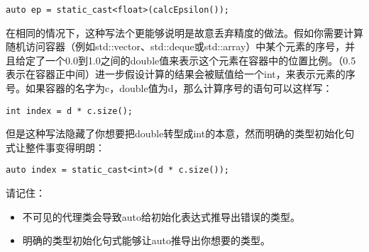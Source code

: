 \begin{lstlisting}
auto ep = static_cast<float>(calcEpsilon());
\end{lstlisting}

在相同的情况下，这种写法个更能够说明是故意丢弃精度的做法。假如你需要计算随机访问容器（例如std::vector、std::deque或std::array）中某个元素的序号，并且给定了一个0.0到1.0之间的double值来表示这个元素在容器中的位置比例。（0.5表示在容器正中间）进一步假设计算的结果会被赋值给一个int，来表示元素的序号。如果容器的名字为c，double值为d，那么计算序号的语句可以这样写：

\begin{lstlisting}
int index = d * c.size();
\end{lstlisting}

但是这种写法隐藏了你想要把double转型成int的本意，然而明确的类型初始化句式让整件事变得明朗：

\begin{lstlisting}
auto index = static_cast<int>(d * c.size());
\end{lstlisting}

\begin{mdframed}
请记住：
\begin{itemize}
\item{不可见的代理类会导致auto给初始化表达式推导出错误的类型。}
\item{明确的类型初始化句式能够让auto推导出你想要的类型。} 
\end{itemize}
\end{mdframed}
